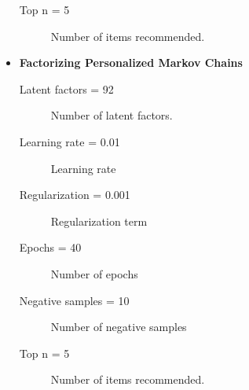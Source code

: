 \documentclass[prodmode,acmtecs]{acmsmall} %
\begin{document}
\begin{itemize}
\begin{description}
					\item [Top n = 5] Number of items recommended.
	\end{description}
	\item \textbf{Factorizing Personalized Markov Chains} 
		\begin{description}
			\item [Latent factors = 92] Number of latent factors.
			\item [Learning rate = 0.01] Learning rate
			\item [Regularization = 0.001] Regularization term
			\item [Epochs = 40] Number of epochs		
			\item [Negative samples = 10] Number of negative samples			
			\item [Top n = 5] Number of items recommended.
	\end{description}
\end{itemize}






\end{document}
